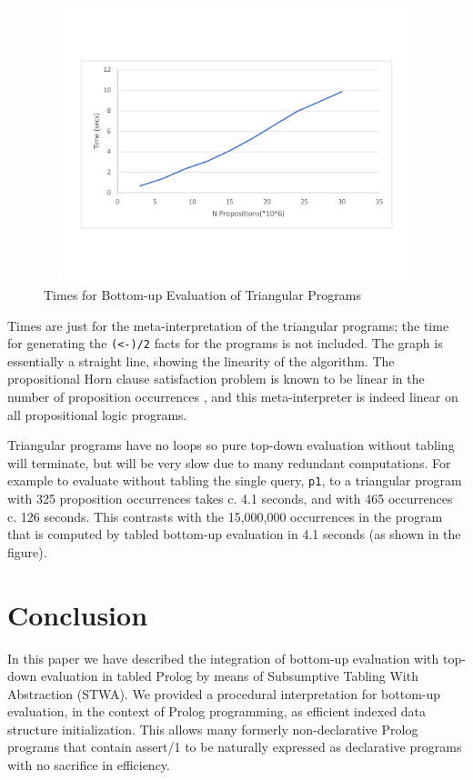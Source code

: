 \begin{figure}
\includegraphics[width=12cm,height=8cm, trim=1.5cm 3.6cm 0cm 4.2cm, clip=true, natwidth=6in, natheight=44in]{time_graphProp2.pdf}
\caption{Times for Bottom-up Evaluation of Triangular Programs}\label{buperftable}
\end{figure}

Times are just for the meta-interpretation of the triangular programs;
the time for generating the {\tt (<-)/2} facts for the programs is not
included. The graph is essentially a straight line, showing the
linearity of the algorithm.  The propositional Horn clause
satisfaction problem is known to be linear in the number of
proposition occurrences \cite{Dowling1984LinearTimeAF}, and this
meta-interpreter is indeed linear on all propositional logic programs.

Triangular programs have no loops so pure top-down evaluation without
tabling will terminate, but will be very slow due to many redundant
computations.  For example to evaluate without tabling the single
query, {\tt p1}, to a triangular program with 325 proposition
occurrences takes c. 4.1 seconds, and with 465 occurrences c. 126
seconds.  This contrasts with the 15,000,000 occurrences in the
program that is computed by tabled bottom-up evaluation in 4.1 seconds
(as shown in the figure).


\section{Conclusion}
In this paper we have described the integration of bottom-up
evaluation with top-down evaluation in tabled Prolog by means of
Subsumptive Tabling With Abstraction (STWA).  We provided a procedural
interpretation for bottom-up evaluation, in the context of Prolog
programming, as efficient indexed data structure initialization.  This
allows many formerly non-declarative Prolog programs that contain
assert/1 to be naturally expressed as declarative programs with no
sacrifice in efficiency.

